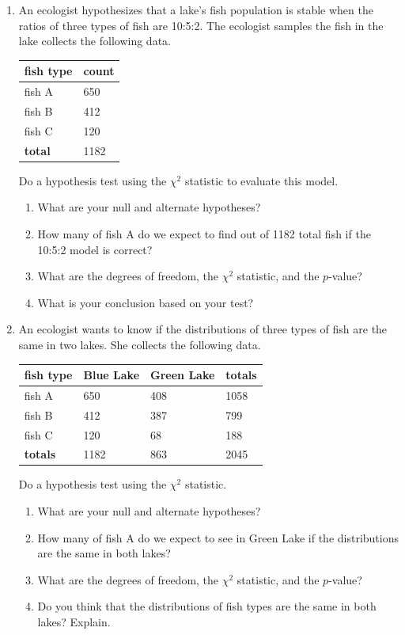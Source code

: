 \documentclass[12pt,fullpage]{amsart}
\begin{document}
\begin{enumerate}
\item An ecologist hypothesizes that a lake's fish population is stable when the ratios of three types of fish are 10:5:2. The ecologist samples the fish in the lake collects the following data.

\begin{tabular}{ll}
\textbf{fish type} & \textbf{count}\\
\hline
fish A & 650\\
fish B & 412\\
fish C & 120\\
\hline
\textbf{total} & 1182
\end{tabular}

Do a hypothesis test using the $\chi^2$ statistic to evaluate this model.
\begin{enumerate}
  \item What are your null and alternate hypotheses?
  \item How many of fish A do we expect to find out of 1182 total fish if the 10:5:2 model is correct?
  \item What are the degrees of freedom, the $\chi^2$ statistic, and the $p$-value?
\item What is your conclusion based on your test?
  \end{enumerate}

\item An ecologist wants to know if the distributions of three types of fish are the same in two lakes. She collects the following data.

\begin{tabular}{llll}
\textbf{fish type} & \textbf{Blue Lake} & \textbf{Green Lake} & \textbf{totals}\\
\hline
fish A & 650 & 408 & 1058\\
fish B & 412 & 387 & 799\\
fish C & 120 & 68 & 188\\
\hline
\textbf{totals} & 1182 & 863 & 2045
\end{tabular}

Do a hypothesis test using the $\chi^2$ statistic.
\begin{enumerate}
  \item What are your null and alternate hypotheses?
  \item How many of fish A do we expect to see in Green Lake if the distributions are the same in both lakes?
  \item What are the degrees of freedom, the $\chi^2$ statistic, and the $p$-value?
\item Do you think that the distributions of fish types are the same in both lakes? Explain.
\end{enumerate}



\end{enumerate}
\end{document}
